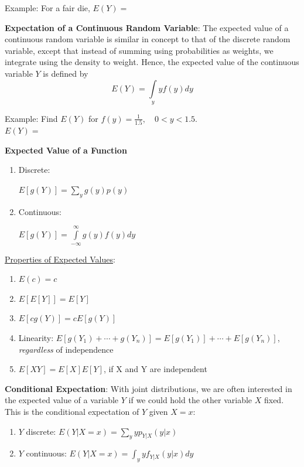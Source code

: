 \documentclass[]{book}
\theoremstyle{definition}
\theoremstyle{definition}
\theoremstyle{definition}
\theoremstyle{remark}
\begin{document}
\begin{framed}
Example: For a fair die, $E(Y)=$  \phantom{We would never expect the
result of a rolled die to be $7/2$, but that would be the average over a
large number of rolls of the die.}
\end{framed}

\textbf{Expectation of a Continuous Random Variable}: The expected value
of a continuous random variable is similar in concept to that of the
discrete random variable, except that instead of summing using
probabilities as weights, we integrate using the density to weight.
Hence, the expected value of the continuous variable \(Y\) is defined by
\[E(Y)=\int\limits_{y} y f(y) dy\]

\begin{framed}
Example:  Find $E(Y)$ for $f(y)=\frac{1}{1.5}, \quad 0<y<1.5$.\\
$E(Y)=$ 
\end{framed}

\textbf{Expected Value of a Function}

\begin{enumerate}
  \item \parbox[t]{1.5in}{Discrete:}   $E[g(Y)]=\sum\limits_y g(y)p(y)$
  \item \parbox[t]{1.5in}{Continuous:} $E[g(Y)]=\int\limits_{-\infty}^\infty g(y)f(y)dy$
\end{enumerate}

\underline{Properties of Expected Values}:

\begin{enumerate}
\item $E(c)=c$
\item $E[E[Y]] = E[Y]$ \phantom{(because the expected value of a random variable is a constant)}
\item $E[c g(Y)]= c E[g(Y)]$
\item Linearity: $E[g(Y_1) + \cdots + g(Y_n)]=E[g(Y_1)]+\cdots+E[g(Y_n)]$, \textit{regardless} of independence
\item $E[XY] = E[X]E[Y]$, if X and Y are independent 
\end{enumerate}

\textbf{Conditional Expectation}: With joint distributions, we are often
interested in the expected value of a variable \(Y\) if we could hold
the other variable \(X\) fixed. This is the conditional expectation of
\(Y\) given \(X = x\):

\begin{enumerate}
\item $Y$ discrete:  $E(Y|X = x) = \sum_y yp_{Y|X}(y|x)$
\item $Y$ continuous: $E(Y|X = x) = \int_y yf_{Y|X}(y|x)dy$
\end{enumerate}
\end{document}
